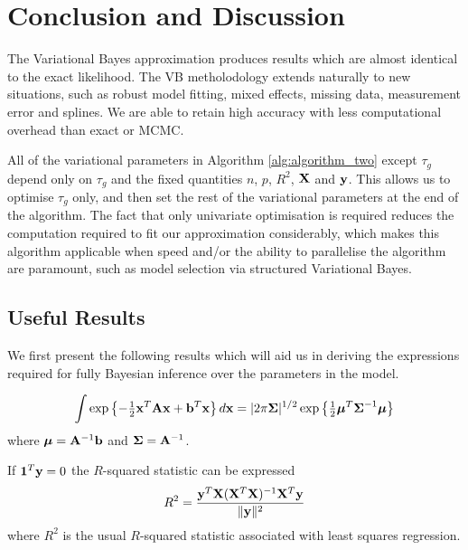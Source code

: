 
\section{Conclusion and Discussion}
\label{sec:conclusion}

The Variational Bayes approximation produces results which are almost identical to the exact likelihood.
The VB metholodology extends naturally to new situations, such as robust model fitting, mixed effects, missing
data, measurement error and splines. We are able to retain high accuracy with less computational overhead than
exact or MCMC.

All of the variational parameters in Algorithm \ref{alg:algorithm_two} except $\tau_g$ depend only on
$\tau_g$ and the fixed quantities $n$, $p$, $R^2$, ${\bf X}$ and ${\bf y}$. This allows us to optimise $\tau_g$
only, and then set the rest of the variational parameters at the end of the algorithm. The fact that only
univariate optimisation is required reduces the computation required to fit our approximation considerably,
which makes this algorithm applicable when speed and/or the ability to parallelise the algorithm are
paramount, such as model selection via structured Variational Bayes.

\appendix
\subsection{Useful Results}	

We first present the following results which will aid us in deriving the expressions required for fully Bayesian
inference over the parameters in the model.

\begin{equation}\label{res:01}
	\int \exp\left\{ -\tfrac{1}{2}{\bf x}^T{\bf A}{\bf x} + {\bf b}^T{\bf x} \right\} d {\bf x} = |2\pi{\boldsymbol\Sigma}|^{1/2} \exp\left\{ \tfrac{1}{2}{\boldsymbol \mu}^T{\boldsymbol \Sigma}^{-1}{\boldsymbol \mu} \right\}
\end{equation}
where ${\boldsymbol \mu} = {\bf A}^{-1}{\bf b}$ and ${\boldsymbol \Sigma} = {\bf A}^{-1}$.
 
If ${\bf 1}^T{\bf y}=0$ the $R$-squared statistic can be expressed
\begin{equation} \label{res:02}
	R^2 = \frac{{\bf y}^T{\bf X}({\bf X}^T{\bf X})^{-1}{\bf X}^T{\bf y}}{\|{\bf y}\|^2}
\end{equation}
where $R^2$ is the usual $R$-squared statistic associated with least squares regression.

